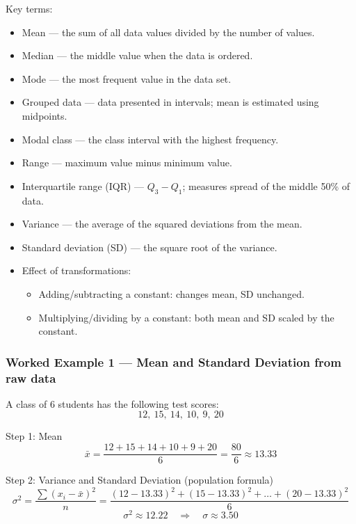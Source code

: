 \documentclass[11pt]{article}
\def\textbf#1{#1}%
\begin{document}
\begin{keyideas}
\textbf{Key terms:}
\begin{itemize}
    \item \textbf{Mean} — the sum of all data values divided by the number of values.
    \item \textbf{Median} — the middle value when the data is ordered.
    \item \textbf{Mode} — the most frequent value in the data set.
    \item \textbf{Grouped data} — data presented in intervals; mean is estimated using midpoints.
    \item \textbf{Modal class} — the class interval with the highest frequency.
    \item \textbf{Range} — maximum value minus minimum value.
    \item \textbf{Interquartile range (IQR)} — $Q_3 - Q_1$; measures spread of the middle 50\% of data.
    \item \textbf{Variance} — the average of the squared deviations from the mean.
    \item \textbf{Standard deviation (SD)} — the square root of the variance.
    \item \textbf{Effect of transformations:}
        \begin{itemize}
            \item Adding/subtracting a constant: changes mean, SD unchanged.
            \item Multiplying/dividing by a constant: both mean and SD scaled by the constant.
        \end{itemize}
\end{itemize}
\end{keyideas}

\subsubsection*{Worked Example 1 — Mean and Standard Deviation from raw data}
A class of 6 students has the following test scores:  
\[ 12, \ 15, \ 14, \ 10, \ 9, \ 20 \]

\textbf{Step 1: Mean}
\[
\bar{x} = \frac{12 + 15 + 14 + 10 + 9 + 20}{6} = \frac{80}{6} \approx 13.33
\]

\textbf{Step 2: Variance and Standard Deviation (population formula)}
\[
\sigma^2 = \frac{\sum (x_i - \bar{x})^2}{n} 
= \frac{(12-13.33)^2 + (15-13.33)^2 + \dots + (20-13.33)^2}{6} 
\]
\[
\sigma^2 \approx 12.22 \quad\Rightarrow\quad \sigma \approx 3.50
\]
\end{document}
